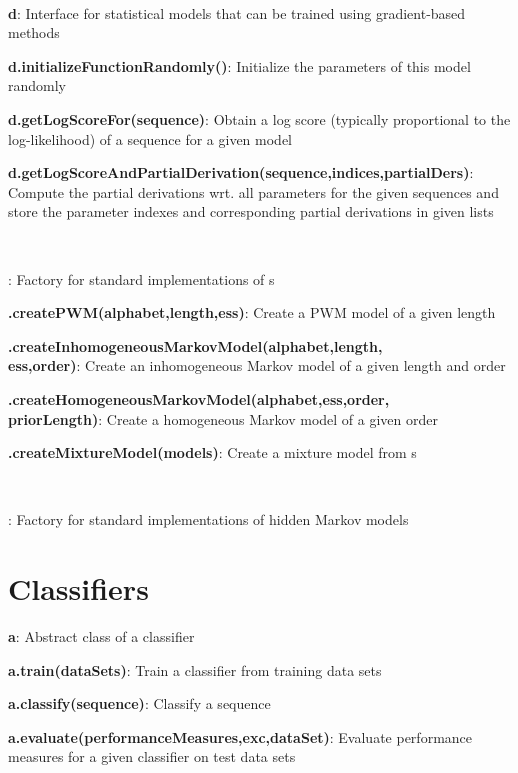 \documentclass[10pt]{scrartcl}
\newcommand{\entry}[3]{{\bfseries #1#2}: #3}
\begin{document}
\begin{flushleft}
~

\entry{\DiffSM}{ d}{Interface for statistical models that can be trained using gradient-based methods}

\entry{d}{.initializeFunctionRandomly()}{Initialize the parameters of this model randomly}

\entry{d}{.getLogScoreFor(sequence)}{Obtain a log score (typically proportional to the log-likelihood) of a sequence for a given model}

\entry{d}{.getLogScoreAndPartialDerivation(sequence,indices,partialDers)}{Compute the partial derivations wrt. all parameters for the given sequences and store the parameter indexes and corresponding partial derivations in given lists}

~

%
\entry{\DiffSMFactory}{}{Factory for standard implementations of \DiffSM s}

\entry{\DiffSMFactory}{.createPWM(alphabet,length,ess)}{Create a PWM model of a given length}

\entry{\DiffSMFactory}{.createInhomogeneousMarkovModel(alphabet,length,\\ess,order)}{Create an inhomogeneous Markov model of a given length and order}

\entry{\DiffSMFactory}{.createHomogeneousMarkovModel(alphabet,ess,order,\\priorLength)}{Create a homogeneous Markov model of a given order}

\entry{\DiffSMFactory}{.createMixtureModel(models)}{Create a mixture model from \DiffSM s}

~

\entry{\HMMFactory}{}{Factory for standard implementations of hidden Markov models}

\section{Classifiers}

\entry{\AbstractClassifier}{ a}{Abstract class of a classifier}

\entry{a}{.train(dataSets)}{Train a classifier from training data sets}

\entry{a}{.classify(sequence)}{Classify a sequence}

\entry{a}{.evaluate(performanceMeasures,exc,dataSet)}{Evaluate performance measures for a given classifier on test data sets}


\end{flushleft}
\end{document}
